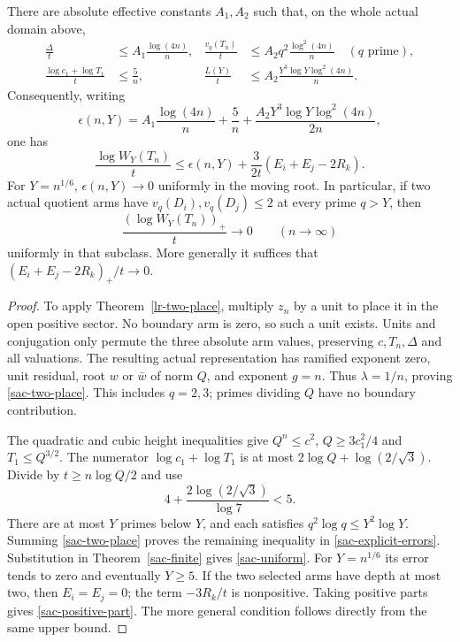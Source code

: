 \begin{theorem}
\label{sac-subclass}
There are absolute effective constants $A_1,A_2$ such that, on the
whole actual domain above,
\begin{align}
 \frac{\Delta}{t}&\le A_1\frac{\log(4n)}n,&
 \frac{v_q(T_n)}t&\le A_2q^2\frac{\log^2(4n)}n
                    \quad(q\text{ prime}),\label{sac-two-place}\\
 \frac{\log c_1+\log T_1}{t}&\le\frac5n,&
 \frac{L(Y)}t&\le A_2\frac{Y^3\log Y\log^2(4n)}n.
                    \label{sac-explicit-errors}
\end{align}
Consequently, writing
\[
 \epsilon(n,Y)=A_1\frac{\log(4n)}n+\frac5n+
             \frac{A_2Y^3\log Y\log^2(4n)}{2n},
\]
one has
\begin{equation}\label{sac-uniform}
 \frac{\log W_Y(T_n)}t
 \le\epsilon(n,Y)+\frac{3}{2t}(E_i+E_j-2R_k).
\end{equation}
For $Y=n^{1/6}$, $\epsilon(n,Y)\to0$ uniformly in the moving root.
In particular, if two actual quotient arms have $v_q(D_i),v_q(D_j)\le2$
at every prime $q>Y$, then
\begin{equation}\label{sac-positive-part}
 \frac{(\log W_Y(T_n))_+}{t}\longrightarrow0
 \qquad(n\longrightarrow\infty)
\end{equation}
uniformly in that subclass. More generally it suffices that
$ (E_i+E_j-2R_k)_+/t\to0$.
\end{theorem}
\begin{proof}
To apply Theorem~\ref{lr-two-place}, multiply $z_n$ by a unit to
place it in the open positive sector. No boundary arm is zero, so such
a unit exists. Units and conjugation only permute the three absolute
arm values, preserving $c,T_n,\Delta$ and all valuations. The resulting
actual representation has ramified exponent zero, unit residual,
root $w$ or $\bar w$ of norm $Q$, and exponent $g=n$. Thus
$\lambda=1/n$, proving \eqref{sac-two-place}. This includes $q=2,3$;
primes dividing $Q$ have no boundary contribution.

The quadratic and cubic height inequalities give
$Q^n\le c^2$, $Q\ge3c_1^2/4$ and $T_1\le Q^{3/2}$.
The numerator $\log c_1+\log T_1$ is at most
$2\log Q+\log(2/\sqrt3)$. Divide by $t\ge n\log Q/2$ and use
\[
 4+\frac{2\log(2/\sqrt3)}{\log7}<5.
\]
There are at most $Y$ primes below $Y$, and each satisfies
$q^2\log q\le Y^2\log Y$. Summing \eqref{sac-two-place} proves
the remaining inequality in \eqref{sac-explicit-errors}.
Substitution in Theorem~\ref{sac-finite} gives \eqref{sac-uniform}.
For $Y=n^{1/6}$ its error tends to zero and eventually $Y\ge5$.
If the two selected arms have depth at most two, then $E_i=E_j=0$;
the term $-3R_k/t$ is nonpositive. Taking positive parts gives
\eqref{sac-positive-part}. The more general condition follows directly
from the same upper bound.
\end{proof}

